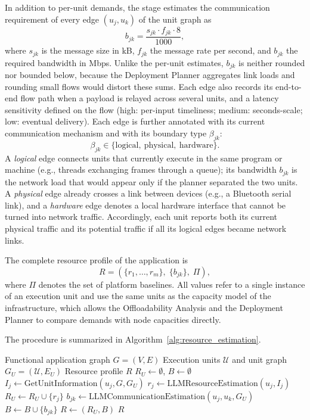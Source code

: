 In addition to per-unit demands, the stage estimates the communication
requirement of every edge $(u_j,u_k)$ of the unit graph as
\begin{equation}
b_{jk} = \frac{s_{jk}\cdot f_{jk}\cdot 8}{1000},
\end{equation}
where $s_{jk}$ is the message size in kB, $f_{jk}$ the message rate per
second, and $b_{jk}$ the required bandwidth in Mbps. Unlike the per-unit
estimates, $b_{jk}$ is neither rounded nor bounded below, because the
Deployment Planner aggregates link loads and rounding small flows would
distort these sums. Each edge also records its end-to-end flow path when
a payload is relayed across several units, and a latency sensitivity defined
on the flow (high: per-input timeliness; medium: seconds-scale; low: eventual
delivery). Each edge is further annotated with its current
communication mechanism and with its boundary type $\beta_{jk}$:
\begin{equation}
\beta_{jk}\in\{\mathrm{logical},\ \mathrm{physical},\ \mathrm{hardware}\}.
\end{equation}
A \emph{logical} edge connects units that currently execute in the same
program or machine (e.g., threads exchanging frames through a queue); its
bandwidth $b_{jk}$ is the network load that would appear only if the planner
separated the two units. A \emph{physical} edge already crosses a link between
devices (e.g., a Bluetooth serial link), and a \emph{hardware} edge denotes a
local hardware interface that cannot be turned into network traffic.
Accordingly, each unit reports both its current physical traffic and its
potential traffic if all its logical edges became network links.

The complete resource profile of the application is
\begin{equation}
R = \left( \{r_1,\ldots,r_m\},\; \{b_{jk}\},\; \Pi \right),
\end{equation}
where $\Pi$ denotes the set of platform baselines. All values refer to a single instance of an execution unit and use the same
units as the capacity model of the infrastructure, which allows the
Offloadability Analysis and the Deployment Planner to compare demands with
node capacities directly.

The procedure is summarized in Algorithm~\ref{alg:resource_estimation}.

\begin{algorithm}[ht]
\caption{LLM-based Resource Estimation}
\label{alg:resource_estimation}
\begin{algorithmic}[1]
\Require Functional application graph $G=(V,E)$
\Require Execution units $\mathcal{U}$ and unit graph $G_U=(\mathcal{U},E_U)$
\Ensure Resource profile $R$
\State $R_U \leftarrow \emptyset$, $B \leftarrow \emptyset$
  \State $I_j \leftarrow \mathrm{GetUnitInformation}(u_j, G, G_U)$
  \State $r_j \leftarrow \mathrm{LLMResourceEstimation}(u_j, I_j)$
  \State $R_U \leftarrow R_U \cup \{r_j\}$
\EndFor
{}
  \State $b_{jk} \leftarrow \mathrm{LLMCommunicationEstimation}(u_j,u_k,G_U)$
  \State $B \leftarrow B \cup \{b_{jk}\}$
\EndFor
\State $R \leftarrow (R_U, B)$
\State \Return $R$
\end{algorithmic}
\end{algorithm}
